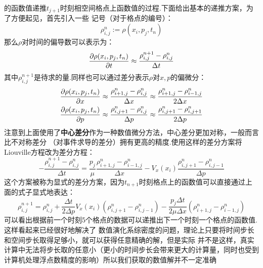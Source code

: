     的函数值递推$t_{j+1}$时刻相空间格点上函数值的过程.下面给出基本的递推方案，为了方便起见，首先引入一些
    记号（对于格点的编号）：
    \begin{equation}
        \rho_{i, j}^{n} := \rho(x_i, p_j, t_n)
    \end{equation}
    那么$\rho$对时间的偏导数可以表示为：
    \begin{equation}
        \frac{\partial{\rho(x_i, p_j, t_n)}}{\partial{t}} \approx  \frac{\rho_{i, j}^{n + 1} - \rho_{i, j}^{n}}{\Delta t}
    \end{equation}
    其中$\rho_{i, j}^{n+1}$是待求的量.同样也可以通过差分表示$\rho$对$x, p$的偏微分：
    \begin{equation}
        \begin{split}
            \frac{\partial{\rho(x_i, p_j, t_n)}}{\partial{x}} &\approx \frac{\rho_{i + 1, j}^{n} - \rho_{i, j}^n}{\Delta x}
             \approx \frac{\rho_{i + 1, j}^{n} - \rho_{i-1, j}^n}{2\Delta x}\\
             \frac{\partial{\rho(x_i, p_j, t_n)}}{\partial{p}} &\approx \frac{\rho_{i, j+1}^{n} - \rho_{i, j}^n}{\Delta p}
             \approx \frac{\rho_{i, j+1}^{n} - \rho_{i, j+1}^n}{2\Delta p}
        \end{split}
    \end{equation}
    注意到上面使用了\textbf{中心差分}作为一种数值微分方法，中心差分更加对称，一般而言比不对称差分
    （对事件求导的差分）拥有更高的精度.使用这样的差分方案将Liouville方程改为差分方程：
    \begin{equation}
        -\frac{\rho_{i, j}^{n+1} - \rho_{i, j}^{n}}{\Delta t} = \frac{p_j}{\mu}
        \frac{\rho_{i+1, j}^{n} - \rho_{i-1, j}^{n}}{\Delta x} - V_x(x_i)
        \frac{\rho_{i, j+1}^{n} - \rho_{i, j-1}^{n}}{\Delta p}
    \end{equation}
    这个方案被称为显式的差分方案，因为$t_{n+1}$时刻格点上的函数值可以直接通过上面的式子显式地表达：
    \begin{equation}
        \rho_{i, j}^{n+1} = \rho_{i, j}^{n} + \frac{\Delta t}{2\Delta p}V_{x}(x_i)(\rho_{i, j+1}^{n} - \rho_{i, j-1}^{n})
        - \frac{p_j\Delta t}{2 \mu \Delta x}(\rho_{i+1, j}^{n} - \rho_{i-1, j}^{n}) 
    \end{equation}
    可以看出根据前一个时刻5个格点的数据可以递推出下一个时刻一个格点的函数值.这样看起来已经很好地解决了
    数值演化系综密度的问题，理论上只要将时间步长和空间步长取得足够小，就可以获得任意精确的解，但是实际
    并不是这样，真实计算中无法将步长取的任意小（更小的时间步长会带来更大的计算量，同时也受到
    计算机处理浮点数精度的影响）所以我们获取的数值解并不一定准确
